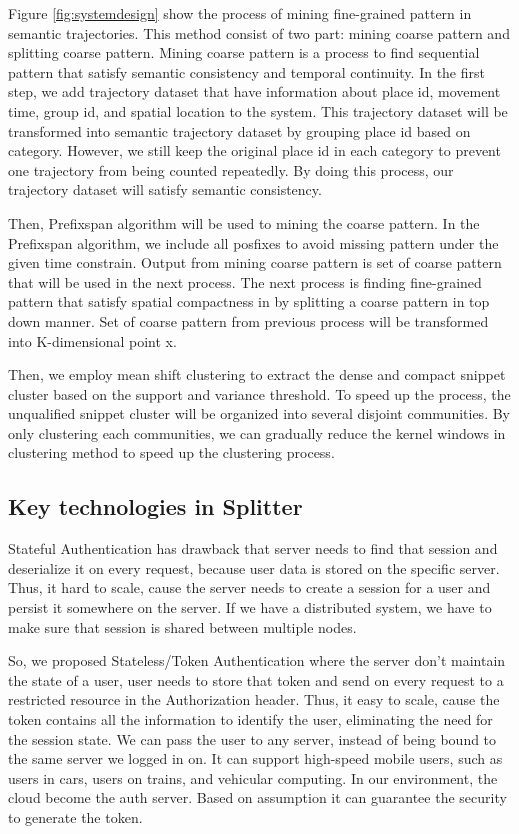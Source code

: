 \documentclass[conference]{IEEEtran}
\begin{document}
Figure \ref{fig:systemdesign} show the process of mining fine-grained pattern in semantic trajectories. This method consist of two part: mining coarse pattern and splitting coarse pattern. Mining coarse pattern is a process to find sequential pattern that satisfy semantic consistency and temporal continuity. In the first step, we add trajectory dataset that have information about place id, movement time, group id, and spatial location to the system. This trajectory dataset will be transformed into semantic trajectory dataset by grouping place id based on category. However, we still keep the original place id in each category to prevent one trajectory from being counted repeatedly. By doing this process, our trajectory dataset will satisfy semantic consistency.
\par
Then, Prefixspan algorithm will be used to mining the coarse pattern. In the Prefixspan algorithm, we include all posfixes to avoid missing pattern under the given time constrain. Output from mining coarse pattern is set of coarse pattern that will be used in the next process. The next process is finding fine-grained pattern that satisfy spatial compactness in by splitting a coarse pattern in top down manner. Set of coarse pattern from previous process will be transformed into K-dimensional point x.
\par
Then, we employ mean shift clustering to extract the dense and compact snippet cluster based on the support and variance threshold. To speed up the process, the unqualified snippet cluster will be organized into several disjoint communities. By only clustering each communities, we can gradually reduce the kernel windows in clustering method to speed up the clustering process.

\subsection{Key technologies in Splitter}
Stateful Authentication has drawback that server needs to find that session and deserialize it on every request, because user data is stored on the specific server. Thus, it hard to scale, cause the server needs to create a session for a user and persist it somewhere on the server. If we have a distributed system, we have to make sure that session is shared between multiple nodes.

So, we proposed Stateless/Token Authentication where the server don't maintain the state of a user, user needs to store that token and send on every request to a restricted resource in the Authorization header. Thus, it easy to scale, cause the token contains all the information to identify the user, eliminating the need for the session state. We can pass the user to any server, instead of being bound to the same server we logged in on.
It can support high-speed mobile users, such as users in cars, users on trains, and vehicular computing. In our environment, the cloud become the auth server. Based on assumption it can guarantee the security to generate the token.
\end{document}
